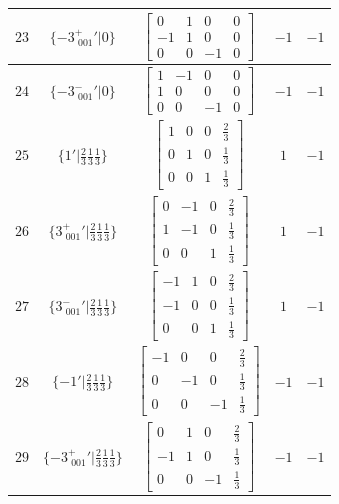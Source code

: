 \documentclass[fleqn,8pt]{jsarticle}
\begin{document}
\begin{longtable}{ccccc}
$ 23 $ & $ \{-3^{+}_{\,\,001}{}'|0\} $ & $ \begin{bmatrix} 0 & 1 & 0 & 0 \\ -1 & 1 & 0 & 0 \\ 0 & 0 & -1 & 0 \end{bmatrix} $ & $ -1 $ & $ -1 $ \\ \hline
$ 24 $ & $ \{-3^{-}_{\,\,001}{}'|0\} $ & $ \begin{bmatrix} 1 & -1 & 0 & 0 \\ 1 & 0 & 0 & 0 \\ 0 & 0 & -1 & 0 \end{bmatrix} $ & $ -1 $ & $ -1 $ \\ \hline
$ 25 $ & $ \{1{}'|\frac{2}{3} \frac{1}{3} \frac{1}{3}\} $ & $ \begin{bmatrix} 1 & 0 & 0 & \frac{2}{3} \\ 0 & 1 & 0 & \frac{1}{3} \\ 0 & 0 & 1 & \frac{1}{3} \end{bmatrix} $ & $ 1 $ & $ -1 $ \\ \hline
$ 26 $ & $ \{3^{+}_{\,\,001}{}'|\frac{2}{3} \frac{1}{3} \frac{1}{3}\} $ & $ \begin{bmatrix} 0 & -1 & 0 & \frac{2}{3} \\ 1 & -1 & 0 & \frac{1}{3} \\ 0 & 0 & 1 & \frac{1}{3} \end{bmatrix} $ & $ 1 $ & $ -1 $ \\ \hline
$ 27 $ & $ \{3^{-}_{\,\,001}{}'|\frac{2}{3} \frac{1}{3} \frac{1}{3}\} $ & $ \begin{bmatrix} -1 & 1 & 0 & \frac{2}{3} \\ -1 & 0 & 0 & \frac{1}{3} \\ 0 & 0 & 1 & \frac{1}{3} \end{bmatrix} $ & $ 1 $ & $ -1 $ \\ \hline
$ 28 $ & $ \{-1{}'|\frac{2}{3} \frac{1}{3} \frac{1}{3}\} $ & $ \begin{bmatrix} -1 & 0 & 0 & \frac{2}{3} \\ 0 & -1 & 0 & \frac{1}{3} \\ 0 & 0 & -1 & \frac{1}{3} \end{bmatrix} $ & $ -1 $ & $ -1 $ \\ \hline
$ 29 $ & $ \{-3^{+}_{\,\,001}{}'|\frac{2}{3} \frac{1}{3} \frac{1}{3}\} $ & $ \begin{bmatrix} 0 & 1 & 0 & \frac{2}{3} \\ -1 & 1 & 0 & \frac{1}{3} \\ 0 & 0 & -1 & \frac{1}{3} \end{bmatrix} $ & $ -1 $ & $ -1 $ \\ \hline

\end{longtable}
\end{document}
